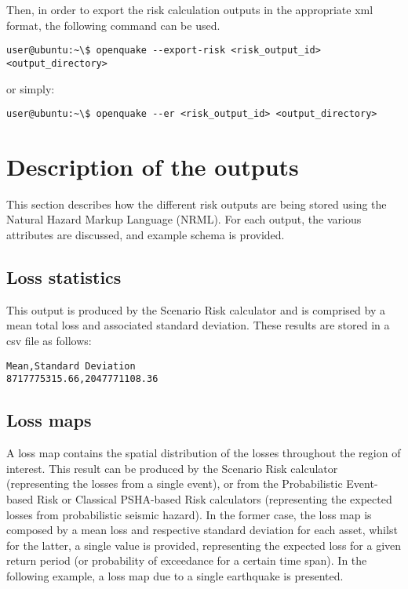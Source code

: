 Then, in order to export the risk calculation outputs in the appropriate xml format, the following command can be used.

\begin{Verbatim}[frame=single, commandchars=\\\{\}, samepage=true]
user@ubuntu:~\$ openquake --export-risk <risk_output_id>  
<output_directory>
\end{Verbatim}

or simply:

\begin{Verbatim}[frame=single, commandchars=\\\{\}, samepage=true]
user@ubuntu:~\$ openquake --er <risk_output_id> <output_directory>
\end{Verbatim}

\section{Description of the outputs}
This section describes how the different risk outputs are being stored using the Natural Hazard Markup Language (NRML). For each output, the various attributes are discussed, and example schema is provided.

\subsection{Loss statistics}
This output is produced by the Scenario Risk calculator and is comprised by a mean total loss and associated standard deviation. These results are stored in a csv file as follows: 

\begin{Verbatim}[frame=single, commandchars=\\\{\}, samepage=true]
Mean,Standard Deviation
8717775315.66,2047771108.36
\end{Verbatim}

\subsection{Loss maps}
A loss map contains the spatial distribution of the losses throughout the region of interest. This result can be produced by the Scenario Risk calculator (representing the losses from a single event), or from the Probabilistic Event-based Risk or Classical PSHA-based Risk calculators (representing the expected losses from probabilistic seismic hazard). In the former case, the loss map is composed by a mean loss and respective standard deviation for each asset, whilst for the latter, a single value is provided, representing the expected loss for a given return period (or probability of exceedance for a certain time span). In the following example, a loss map due to a single earthquake is presented.
 
